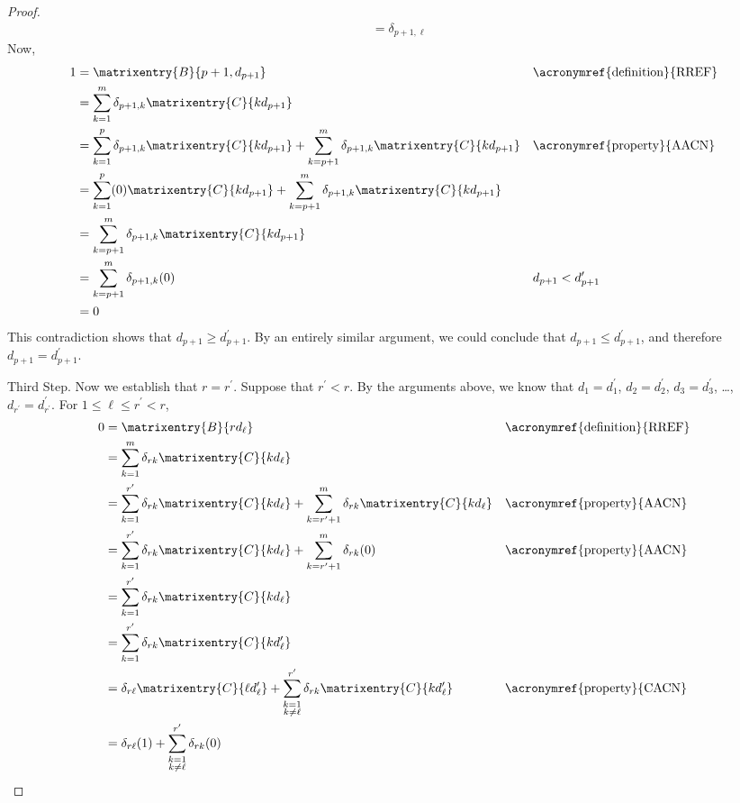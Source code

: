 \begin{proof}
\begin{align*}
%
&=\delta_{p+1,\ell}
%
\end{align*}
%
Now,
%
\begin{align*}
1
&=\matrixentry{B}{p+1,d_{p+1}}
&&\text{\acronymref{definition}{RREF}}\\
%
&=\sum_{k=1}^{m}\delta_{p+1,k}\matrixentry{C}{kd_{p+1}}\\
%
&=
\sum_{k=1}^{p}\delta_{p+1,k}\matrixentry{C}{kd_{p+1}}+
\sum_{k=p+1}^{m}\delta_{p+1,k}\matrixentry{C}{kd_{p+1}}
&&\text{\acronymref{property}{AACN}}\\
%
&=
\sum_{k=1}^{p}(0)\matrixentry{C}{kd_{p+1}}+
\sum_{k=p+1}^{m}\delta_{p+1,k}\matrixentry{C}{kd_{p+1}}\\
%
&=\sum_{k=p+1}^{m}\delta_{p+1,k}\matrixentry{C}{kd_{p+1}}\\
%
&=\sum_{k=p+1}^{m}\delta_{p+1,k}(0)
&&d_{p+1}<d^\prime_{p+1}\\
%
&=0
%
\end{align*}
%
This contradiction shows that
$d_{p+1}\geq d^\prime_{p+1}$.  By an entirely similar argument, we could conclude that $d_{p+1}\leq d^\prime_{p+1}$, and therefore $d_{p+1}=d^\prime_{p+1}$.\par
%
Third Step.  Now we establish that $r=r^\prime$.  Suppose that $r^\prime<r$.  By the arguments above, we know that $d_1=d^\prime_1$, $d_2=d^\prime_2$, $d_3=d^\prime_3$, \dots, $d_{r^\prime}=d^\prime_{r^\prime}$.   For $1\leq\ell\leq r^\prime<r$,
%
\begin{align*}
0
&=\matrixentry{B}{rd_\ell}
&&\text{\acronymref{definition}{RREF}}\\
%
&=\sum_{k=1}^{m}\delta_{rk}\matrixentry{C}{kd_\ell}\\
%
&=
\sum_{k=1}^{r^\prime}\delta_{rk}\matrixentry{C}{kd_\ell}
+
\sum_{k=r^\prime+1}^{m}\delta_{rk}\matrixentry{C}{kd_\ell}
&&\text{\acronymref{property}{AACN}}\\%
%
&=
\sum_{k=1}^{r^\prime}\delta_{rk}\matrixentry{C}{kd_\ell}
+
\sum_{k=r^\prime+1}^{m}\delta_{rk}(0)
&&\text{\acronymref{property}{AACN}}\\
%
&=\sum_{k=1}^{r^\prime}\delta_{rk}\matrixentry{C}{kd_\ell}\\
%
&=\sum_{k=1}^{r^\prime}\delta_{rk}\matrixentry{C}{kd^\prime_\ell}\\
%
&=
\delta_{r\ell}\matrixentry{C}{\ell d^\prime_\ell}
+
\sum_{\substack{k=1\\k\neq\ell}}^{r^\prime}\delta_{rk}\matrixentry{C}{kd^\prime_\ell}
&&\text{\acronymref{property}{CACN}}\\
%
&=
\delta_{r\ell}(1)
+
\sum_{\substack{k=1\\k\neq\ell}}^{r^\prime}\delta_{rk}(0)

\end{align*}
\end{proof}
